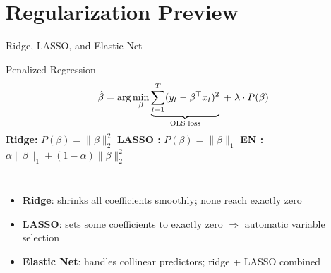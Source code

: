 \documentclass[aspectratio=169, 11pt]{beamer}
\begin{document}
\section{Regularization Preview}


\begin{frame}{Ridge, LASSO, and Elastic Net}
  \begin{definitionbox}{Penalized Regression}
    {\small
    \[
      \hat{\beta} = \arg\min_\beta
      \underbrace{\sum_{t=1}^T (y_t - \beta^\top x_t)^2}_{\text{OLS loss}}
      \;+\; \lambda \cdot P(\beta)
    \]
    \textbf{Ridge:} $P(\beta) = \lVert\beta\rVert_2^2$
    \quad \textbf{LASSO \parencite{Tibshirani1996}:}
    $P(\beta) = \lVert\beta\rVert_1$
    \quad \textbf{EN \parencite{ZouHastie2005}:}
    $\alpha\lVert\beta\rVert_1 + (1{-}\alpha)\lVert\beta\rVert_2^2$
    }
  \end{definitionbox}
  \begin{columns}[T]
      \begin{itemize}\small
        \item \textbf{Ridge}: shrinks all coefficients smoothly;
              none reach exactly zero
        \item \textbf{LASSO}: sets some coefficients to exactly
              zero $\Rightarrow$ automatic variable selection
        \item \textbf{Elastic Net}: handles collinear predictors;
              ridge + LASSO combined
      \end{itemize}
  \end{columns}
\end{frame}
\end{document}
